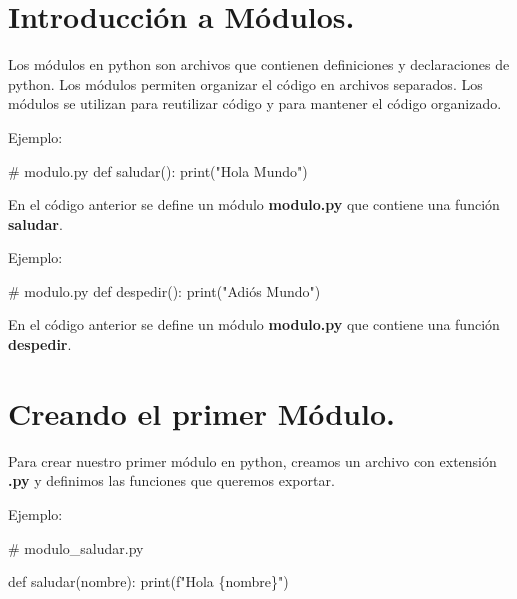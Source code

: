 \documentclass[
  a4paper,
  DIV=11,
  numbers=noendperiod,
  onepage,
  openany]{scrreprt}
\newenvironment{Shaded}{\begin{snugshade}}{\end{snugshade}}
\newcommand{\BuiltInTok}[1]{\textcolor[rgb]{0.00,0.23,0.31}{#1}}
\newcommand{\CommentTok}[1]{\textcolor[rgb]{0.37,0.37,0.37}{#1}}
\newcommand{\KeywordTok}[1]{\textcolor[rgb]{0.00,0.23,0.31}{#1}}
\newcommand{\NormalTok}[1]{\textcolor[rgb]{0.00,0.23,0.31}{#1}}
\newcommand{\SpecialCharTok}[1]{\textcolor[rgb]{0.37,0.37,0.37}{#1}}
\newcommand{\SpecialStringTok}[1]{\textcolor[rgb]{0.13,0.47,0.30}{#1}}
\newcommand{\StringTok}[1]{\textcolor[rgb]{0.13,0.47,0.30}{#1}}
\begin{document}
\section{Introducción a Módulos.}\label{introducciuxf3n-a-muxf3dulos.}

Los módulos en python son archivos que contienen definiciones y
declaraciones de python. Los módulos permiten organizar el código en
archivos separados. Los módulos se utilizan para reutilizar código y
para mantener el código organizado.

Ejemplo:

\begin{Shaded}
\begin{Highlighting}[]
\CommentTok{\# modulo.py }
\KeywordTok{def}\NormalTok{ saludar():}
    \BuiltInTok{print}\NormalTok{(}\StringTok{"Hola Mundo"}\NormalTok{)}
\end{Highlighting}
\end{Shaded}

En el código anterior se define un módulo \textbf{modulo.py} que
contiene una función \textbf{saludar}.

Ejemplo:

\begin{Shaded}
\begin{Highlighting}[]
\CommentTok{\# modulo.py}
\KeywordTok{def}\NormalTok{ despedir():}
    \BuiltInTok{print}\NormalTok{(}\StringTok{"Adiós Mundo"}\NormalTok{)}
\end{Highlighting}
\end{Shaded}

En el código anterior se define un módulo \textbf{modulo.py} que
contiene una función \textbf{despedir}.

\section{Creando el primer Módulo.}\label{creando-el-primer-muxf3dulo.}

Para crear nuestro primer módulo en python, creamos un archivo con
extensión \textbf{.py} y definimos las funciones que queremos exportar.

Ejemplo:

\begin{Shaded}
\begin{Highlighting}[]
\CommentTok{\# modulo\_saludar.py}

\KeywordTok{def}\NormalTok{ saludar(nombre):}
    \BuiltInTok{print}\NormalTok{(}\SpecialStringTok{f"Hola }\SpecialCharTok{\{}\NormalTok{nombre}\SpecialCharTok{\}}\SpecialStringTok{"}\NormalTok{)}
\end{Highlighting}
\end{Shaded}
\end{document}
